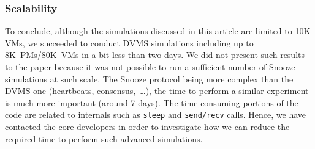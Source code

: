 \subsubsection{\vmps Scalability}
To conclude, although the simulations discussed in this article are
limited to 10K VMs, we succeeded to conduct DVMS simulations including
up to 8K~PMs/80K~VMs in a bit less than two days. We did not present
such results to the paper because it was not possible to run a
sufficient number of Snooze simulations at such scale. The Snooze
protocol being more complex than the DVMS one (heartbeats,
consensus,~\ldots), the time to perform a similar experiment is much
more important (around 7 days). The time-consuming portions of the
code are related to \sg internals such as \texttt{sleep} and
\texttt{send/recv} calls. Hence, we have contacted the \sg core
developers in order to investigate how we can reduce the required time
to perform such advanced simulations.



